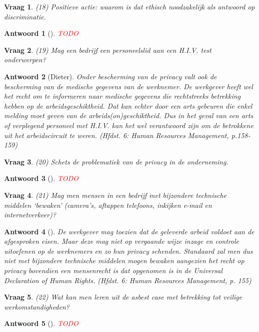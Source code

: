 \documentclass{article}
\theoremstyle{nonumberplain}
\newtheorem{question}{Vraag}
\newtheorem{answer}{Antwoord}
\begin{document}
\begin{question}
(18)	Positieve actie: waarom is dat ethisch noodzakelijk als antwoord op discriminatie.
\end{question}
\begin{answer}[]
\textcolor{red}{TODO}%
\end{answer}

\begin{question}
(19)	Mag een bedrijf een personeelslid aan een H.I.V. test onderwerpen? 
\end{question}
\begin{answer}[Dieter]
	Onder bescherming van de privacy valt ook de bescherming van de medische gegevens van de werknemer.
	De werkgever heeft wel het recht om te informeren naar medische gegevens die rechtstreeks betrekking hebben op de arbeidsgeschiktheid.
	Dat kan echter door een arts gebeuren die enkel melding moet geven van de arbeids(on)geschiktheid.
	Dus in het geval van een arts of verplegend personeel met H.I.V. kan het wel verantwoord zijn om de betrokkene uit het arbeidscircuit te weren.
	\textit{(Hfdst. 6: Human Resources Management, p.158-159)}
\end{answer}

\begin{question}
(20)	Schets de problematiek van de privacy in de onderneming.
\end{question}
\begin{answer}[]
\textcolor{red}{TODO}%
\end{answer}

\begin{question}
(21)	Mag men mensen in een bedrijf met bijzondere technische middelen `bewaken' (camera's, aftappen telefoons, inkijken e-mail en internetverkeer)?
\end{question}
\begin{answer}[]
	De werkgever mag toezien dat de geleverde arbeid voldoet aan de afgesproken eisen.
	Maar deze mag niet op vergaande wijze inzage en controle uitoefenen op de werknemers en zo hun privacy schenden.
	Standaard zal men dus niet met bijzondere technische middelen mogen bewaken aangezien het recht op privacy bovendien een mensenrecht is dat opgenomen is in de \emph{Universal Declaration of Human Rights}.
	\textit{(Hfdst. 6: Human Resources Management, p. 155)}
\end{answer}

\begin{question}
(22)	Wat kan men leren uit de asbest case met betrekking tot veilige werkomstandigheden? 
\end{question}
\begin{answer}[]
\textcolor{red}{TODO}%
\end{answer}
\end{document}
